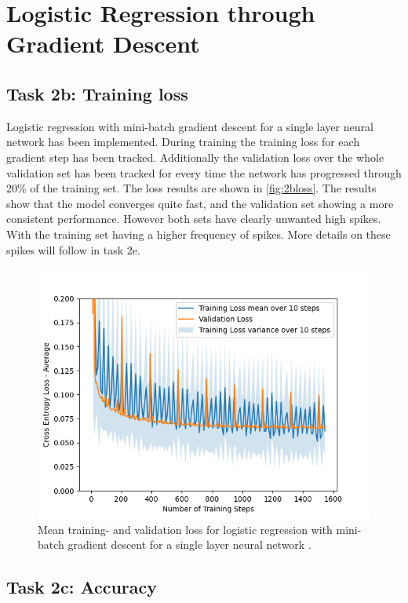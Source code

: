 \documentclass{article}
\begin{document}
\newpage

\section{Logistic Regression through Gradient Descent}
\subsection{Task 2b: Training loss}
Logistic regression with mini-batch gradient descent for a single layer neural network has been implemented. During training the training loss for each gradient step has been tracked. Additionally the validation loss over the whole validation set has been tracked for every time the network has progressed through 20\% of the training set. The loss results are shown in \autoref{fig:2bloss}. The results show that the model converges quite fast, and the validation set showing a more consistent performance. However both sets have clearly unwanted high spikes. With the training set having a higher frequency of spikes. More details on these spikes will follow in task 2e.

\begin{figure}[H]
    \centering
    \includegraphics[width = \textwidth]{Assignment_1/Assignments/plots/task2abc/task2b_binary_train_loss.png}
    \caption{Mean training- and validation loss for logistic regression with mini-batch gradient descent for a single layer neural network .}
    \label{fig:2bloss}
\end{figure}

\subsection{Task 2c: Accuracy}
\end{document}
